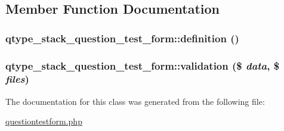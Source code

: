 \subsection{Member Function Documentation}
\hypertarget{classqtype__stack__question__test__form_aea982b9686ff7a36d83172761ecf437f}{
\subsubsection[{definition}]{\setlength{\rightskip}{0pt plus 5cm}qtype\_\-stack\_\-question\_\-test\_\-form::definition ()}}
\label{classqtype__stack__question__test__form_aea982b9686ff7a36d83172761ecf437f}
\hypertarget{classqtype__stack__question__test__form_a100d85a12058c8e609292e5abecbc4e9}{
\subsubsection[{validation}]{\setlength{\rightskip}{0pt plus 5cm}qtype\_\-stack\_\-question\_\-test\_\-form::validation (\$ {\em data}, \/  \$ {\em files})}}
\label{classqtype__stack__question__test__form_a100d85a12058c8e609292e5abecbc4e9}


The documentation for this class was generated from the following file:\begin{DoxyCompactItemize}
\item 
\hyperlink{questiontestform_8php}{questiontestform.php}\end{DoxyCompactItemize}
